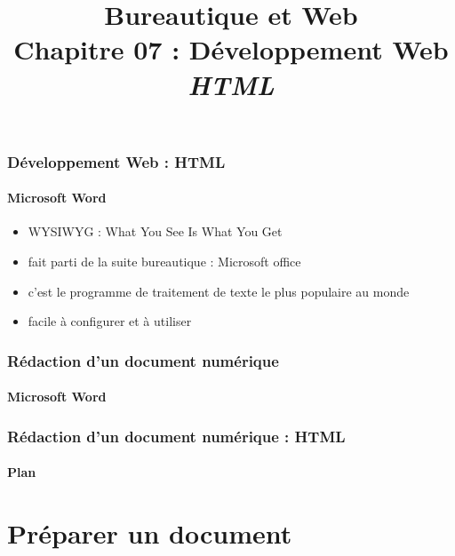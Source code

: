 \documentclass[xcolor=table]{beamer}
\title[BWEB : 07- Web (HTML)] %
{Bureautique et Web \\Chapitre 07 : Développement Web\\ \slshape\small  HTML}
\begin{document}
\begin{frame}
\frametitle{Développement Web : HTML}
\framesubtitle{Microsoft Word}

\begin{itemize}
	\item WYSIWYG : What You See Is What You Get
	\item fait parti de la suite bureautique : Microsoft office
	\item c'est le programme de traitement de texte le plus populaire au monde
	\item facile à configurer et à utiliser 
\end{itemize}

\end{frame}

\begin{frame}
\frametitle{Rédaction d'un document numérique}
\framesubtitle{Microsoft Word}

\begin{center}
\end{center}

\end{frame}

\begin{frame}
\frametitle{Rédaction d'un document numérique : HTML}
\framesubtitle{Plan}

\begin{multicols}{2}
\tableofcontents
\end{multicols}
\end{frame}

\section{Préparer un document}
\end{document}
